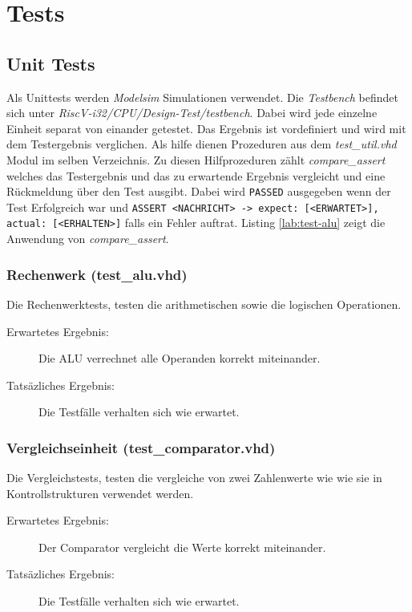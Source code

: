 \chapter{Tests}

    \section{Unit Tests}
        Als Unittests werden \textit{Modelsim} Simulationen verwendet.
        Die \textit{Testbench} befindet sich unter
        \textit{RiscV-i32/CPU/Design-Test/testbench}.
        Dabei wird jede einzelne Einheit separat von einander getestet.
        Das Ergebnis ist vordefiniert und wird mit dem Testergebnis verglichen.
        Als hilfe dienen Prozeduren aus dem \textit{test\_util.vhd} Modul im
        selben Verzeichnis. Zu diesen Hilfprozeduren zählt
        \textit{compare\_assert} welches das Testergebnis und das zu erwartende Ergebnis
        vergleicht und eine Rückmeldung über den Test ausgibt. Dabei wird
        \texttt{PASSED} ausgegeben wenn der Test Erfolgreich war und
        \texttt{ASSERT <NACHRICHT> -> expect: [<ERWARTET>], actual: [<ERHALTEN>]}
        falls ein Fehler auftrat. Listing \ref{lab:test-alu} zeigt die Anwendung
        von \textit{compare\_assert}.
        


        \subsection{Rechenwerk (test\_alu.vhd)}
            Die Rechenwerktests, testen die arithmetischen sowie die logischen 
            Operationen.
            \begin{description}
                \item[Erwartetes Ergebnis:] Die ALU verrechnet alle Operanden korrekt miteinander.
                \item[Tatsäzliches Ergebnis:] Die Testfälle verhalten sich wie erwartet.
            \end{description}

        \subsection{Vergleichseinheit (test\_comparator.vhd)}
            Die Vergleichstests, testen die vergleiche von zwei Zahlenwerte wie
            wie sie in Kontrollstrukturen verwendet werden.
            \begin{description}
                \item[Erwartetes Ergebnis:] Der Comparator vergleicht die Werte
                korrekt miteinander. 
                \item[Tatsäzliches Ergebnis:] Die Testfälle verhalten sich wie erwartet.
            \end{description}


